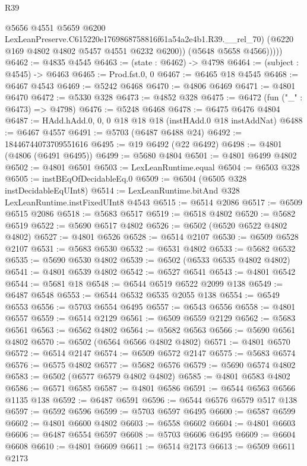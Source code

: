 \begin{lexlean}{R39}
\begin{coremodule}
                @5656
                @4551
                @5659
                @6200
                LexLeanPreserve.C615220e1769868758816f61a54a2e4b1.R39.__rel_70)
              (@6220 @169 @4802 @4802 @5457 @4551 @6232 @6200))
            (@5648 @5658 @4566)))))
@6462 := @4835 @4545
@6463 := (state : @6462) -> @4798
@6464 := (subject : @4545) -> @6463
@6465 := Prod.fst.{0, 0}
@6467 := @6465 @18 @4545
@6468 := @6467 @4543
@6469 := @5242 @6468
@6470 := @4806 @6469
@6471 := @4801 @6470
@6472 := @5330 @328
@6473 := @4852 @328
@6475 := @6472 (fun ("_" : @6473) => @4798)
@6476 := @5248 @6468
@6478 := @6475 @6476 @4804
@6487 := HAdd.hAdd.{0, 0, 0} @18 @18 @18 (instHAdd.{0} @18 instAddNat)
@6488 := @6467 @4557
@6491 := @5703 (@6487 @6488 @24)
@6492 := 18446744073709551616
@6495 := @19 @6492 (@22 @6492)
@6498 := @4801 (@4806 (@6491 @6495))
@6499 := @5680 @4804
@6501 := @4801 @6499 @4802
@6502 := @4801 @6501
@6503 := LexLeanRuntime.equal
@6504 := @6503 @328
@6505 := instBEqOfDecidableEq.{0}
@6509 := @6504 (@6505 @328 instDecidableEqUInt8)
@6514 := LexLeanRuntime.bitAnd @328 LexLeanRuntime.instFixedUInt8 @4543
@6515 := @6514 @2086
@6517 := @6509 @6515 @2086
@6518 := @5683 @6517
@6519 := @6518 @4802
@6520 := @5682 @6519
@6522 := @5690 @6517 @4802
@6526 := @6502 (@6520 @6522 @4802 @4802)
@6527 := @4801 @6526
@6528 := @6514 @2107
@6530 := @6509 @6528 @2107
@6531 := @5683 @6530
@6532 := @6531 @4802
@6533 := @5682 @6532
@6535 := @5690 @6530 @4802
@6539 := @6502 (@6533 @6535 @4802 @4802)
@6541 := @4801 @6539 @4802
@6542 := @6527 @6541
@6543 := @4801 @6542
@6544 := @5681 @18
@6548 := @6544 @6519 @6522 @2099 @138
@6549 := @6487 @6548
@6553 := @6544 @6532 @6535 @2055 @138
@6554 := @6549 @6553
@6556 := @5703 @6554 @6495
@6557 := @6543 @6556
@6558 := @4801 @6557
@6559 := @6514 @2129
@6561 := @6509 @6559 @2129
@6562 := @5683 @6561
@6563 := @6562 @4802
@6564 := @5682 @6563
@6566 := @5690 @6561 @4802
@6570 := @6502 (@6564 @6566 @4802 @4802)
@6571 := @4801 @6570
@6572 := @6514 @2147
@6574 := @6509 @6572 @2147
@6575 := @5683 @6574
@6576 := @6575 @4802
@6577 := @5682 @6576
@6579 := @5690 @6574 @4802
@6583 := @6502 (@6577 @6579 @4802 @4802)
@6585 := @4801 @6583 @4802
@6586 := @6571 @6585
@6587 := @4801 @6586
@6591 := @6544 @6563 @6566 @1135 @138
@6592 := @6487 @6591
@6596 := @6544 @6576 @6579 @517 @138
@6597 := @6592 @6596
@6599 := @5703 @6597 @6495
@6600 := @6587 @6599
@6602 := @4801 @6600 @4802
@6603 := @6558 @6602
@6604 := @4801 @6603
@6606 := @6487 @6554 @6597
@6608 := @5703 @6606 @6495
@6609 := @6604 @6608
@6610 := @4801 @6609
@6611 := @6514 @2173
@6613 := @6509 @6611 @2173

\end{coremodule}
\end{lexlean}
